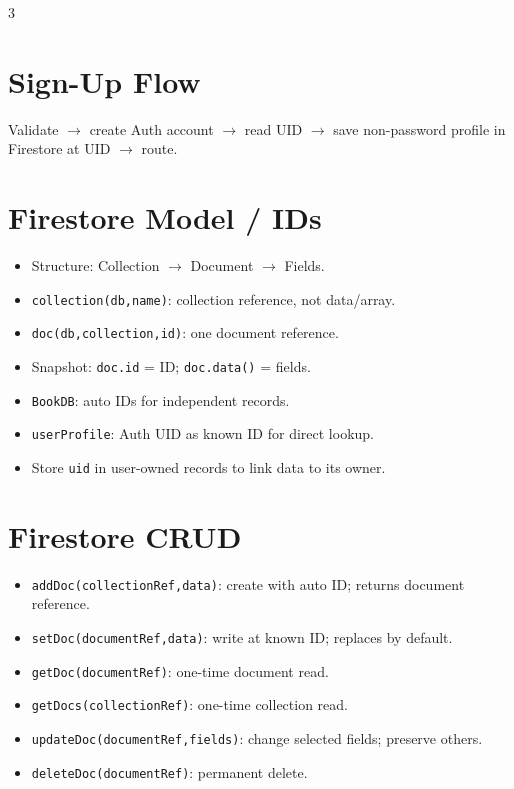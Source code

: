 \documentclass[10pt,a4paper]{article}
\begin{document}
\begin{multicols}{3}
\section*{Sign-Up Flow}
Validate $\rightarrow$ create Auth account $\rightarrow$ read UID $\rightarrow$ save non-password profile in Firestore at UID $\rightarrow$ route.

\section*{Firestore Model / IDs}
\begin{itemize}
  \item Structure: Collection $\rightarrow$ Document $\rightarrow$ Fields.
  \item \texttt{collection(db,name)}: collection reference, not data/array.
  \item \texttt{doc(db,collection,id)}: one document reference.
  \item Snapshot: \texttt{doc.id} = ID; \texttt{doc.data()} = fields.
  \item \texttt{BookDB}: auto IDs for independent records.
  \item \texttt{userProfile}: Auth UID as known ID for direct lookup.
  \item Store \texttt{uid} in user-owned records to link data to its owner.
\end{itemize}

\section*{Firestore CRUD}
\begin{itemize}
  \item \texttt{addDoc(collectionRef,data)}: create with auto ID; returns document reference.
  \item \texttt{setDoc(documentRef,data)}: write at known ID; replaces by default.
  \item \texttt{getDoc(documentRef)}: one-time document read.
  \item \texttt{getDocs(collectionRef)}: one-time collection read.
  \item \texttt{updateDoc(documentRef,fields)}: change selected fields; preserve others.
  \item \texttt{deleteDoc(documentRef)}: permanent delete.
\end{itemize}


\end{multicols}
\end{document}
